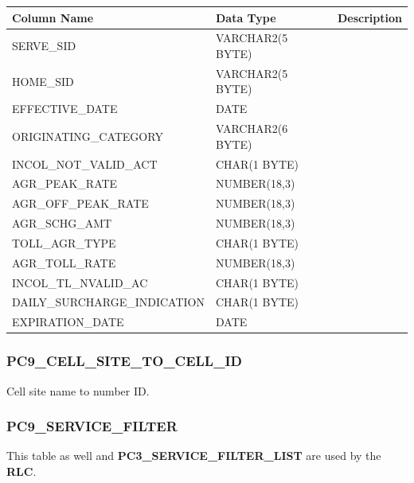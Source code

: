 \documentclass[12pt,twoside]{article}
\begin{document}
\begin{center}
\begin{tabular}{lll}
\hline
 \textbf{Column Name}          &  \textbf{Data Type}  &  \textbf{Description}  \\
\hline
 SERVE\_SID                    &  VARCHAR2(5 BYTE)    &                        \\
 HOME\_SID                     &  VARCHAR2(5 BYTE)    &                        \\
 EFFECTIVE\_DATE               &  DATE                &                        \\
 ORIGINATING\_CATEGORY         &  VARCHAR2(6 BYTE)    &                        \\
 INCOL\_NOT\_VALID\_ACT        &  CHAR(1 BYTE)        &                        \\
 AGR\_PEAK\_RATE               &  NUMBER(18,3)        &                        \\
 AGR\_OFF\_PEAK\_RATE          &  NUMBER(18,3)        &                        \\
 AGR\_SCHG\_AMT                &  NUMBER(18,3)        &                        \\
 TOLL\_AGR\_TYPE               &  CHAR(1 BYTE)        &                        \\
 AGR\_TOLL\_RATE               &  NUMBER(18,3)        &                        \\
 INCOL\_TL\_NVALID\_AC         &  CHAR(1 BYTE)        &                        \\
 DAILY\_SURCHARGE\_INDICATION  &  CHAR(1 BYTE)        &                        \\
 EXPIRATION\_DATE              &  DATE                &                        \\
\hline
\end{tabular}
\end{center}


\normalsize
\subsubsection{PC9\_CELL\_SITE\_TO\_CELL\_ID}
\label{sec-9-14-7}

   Cell site name to number ID.
\subsubsection{PC9\_SERVICE\_FILTER}
\label{sec-9-14-8}

   This table as well and \textbf{PC3\_SERVICE\_FILTER\_LIST} are used by the \textbf{RLC}.
\scriptsize
\end{document}
